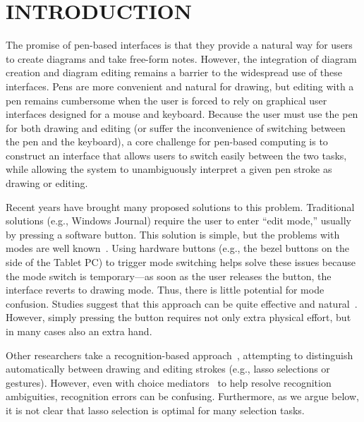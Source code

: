 \documentclass{article}
\begin{document}




\section{INTRODUCTION}

The promise of pen-based interfaces is that they provide a natural way
for users to create diagrams and take free-form notes.  However, the
integration of diagram creation and diagram editing remains a barrier
to the widespread use of these interfaces.  Pens are more convenient
and natural for drawing, but editing with a pen remains cumbersome
when the user is forced to rely on graphical user interfaces designed
for a mouse and keyboard.  Because the user must use the pen for both
drawing and editing (or suffer the inconvenience of switching between
the pen and the keyboard), a core challenge for pen-based computing is
to construct an interface that allows users to switch easily between
the two tasks, while allowing the system to unambiguously interpret a
given pen stroke as drawing or editing.

Recent years have brought many proposed solutions to this problem.
Traditional solutions (e.g., Windows Journal) require the user to
enter ``edit mode,'' usually by pressing a software button.  This
solution is simple, but the problems with modes are well
known~\cite{Tesler1981Smalltalk}.  Using hardware buttons (e.g., the
bezel buttons on the side of the Tablet PC) to trigger mode switching
helps solve these issues because the mode switch is temporary---as
soon as the user releases the button, the interface reverts to drawing
mode.  Thus, there is little potential for mode confusion.  Studies
suggest that this approach can be quite effective and
natural~\cite{Li2005Experimental,Hinckley2006Springboard}.  However,
simply pressing the button requires not only extra physical effort,
but in many cases also an extra hand.

Other researchers take a recognition-based
approach~\cite{Saund2003Stylus,Zeleznik2006Fluid}, attempting to distinguish
automatically between drawing and editing strokes (e.g., lasso
selections or gestures).  However, even with choice
mediators~\cite{Mankoff2000Providing} to help resolve recognition
ambiguities, recognition errors can be confusing.  Furthermore, as we
argue below, it is not clear that lasso selection is optimal for many
selection tasks.
\end{document}
